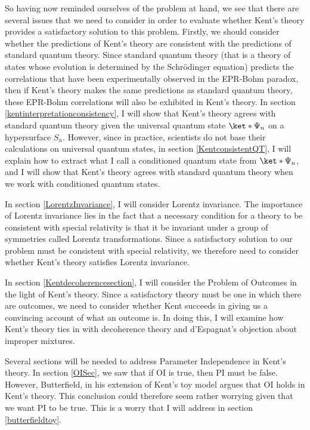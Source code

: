 \documentclass[12pt]{report}
\begin{document}
So having now reminded ourselves of the problem at hand, we see that there are several issues that we need to consider in order to evaluate whether Kent's theory provides a satisfactory solution to this problem. Firstly, we should consider whether the predictions of Kent's theory are consistent with the  predictions of standard quantum theory. Since standard quantum theory (that is a theory of states whose evolution is determined by the Schr\"{o}dinger equation) predicts the correlations that have been experimentally observed in the EPR-Bohm paradox, then if Kent's theory makes the same predictions as standard quantum theory, these EPR-Bohm correlations will also be exhibited in Kent's theory.  In section \ref{kentinterpretationconsistency}, I will show that Kent's theory agrees with standard quantum theory given the universal quantum state $\ket*{\Psi_n}$ on a hypersurface $S_n$. However, since in practice, scientists do not base their calculations on universal quantum states, in section \ref{KentconsistentQT}, I will explain how to extract what I call a conditioned quantum state from $\ket*{\Psi_n}$, and I will show that  Kent's theory agrees with standard quantum theory when we work with conditioned quantum states.

In section \ref{LorentzInvariance}, I will consider Lorentz invariance. The importance of Lorentz invariance lies in the fact that a necessary condition for a theory to be consistent with special relativity is that it be invariant under a group of symmetries called Lorentz transformations. Since a satisfactory solution to our problem must be consistent with special relativity, we therefore need to consider whether Kent's theory satisfies Lorentz invariance. 

In section \ref{Kentdecoherencesection}, I will consider the Problem of Outcomes in the light of Kent's theory. Since a satisfactory theory must be one in which there are outcomes, we need to consider whether Kent succeeds in giving us a convincing account of what an outcome is. In doing this, I will examine how Kent's theory ties in with decoherence theory and d'Espagnat's objection about improper mixtures. 

Several sections will be needed to address Parameter Independence in Kent's theory. In section \ref{OISec}, we saw that if OI is true, then PI must be false. However, Butterfield, in his extension of Kent's toy model argues that OI holds in Kent's theory. This  conclusion could therefore seem rather worrying given that we want PI to be true. This is a worry that I will address in section  \ref{butterfieldtoy}.
\end{document}
